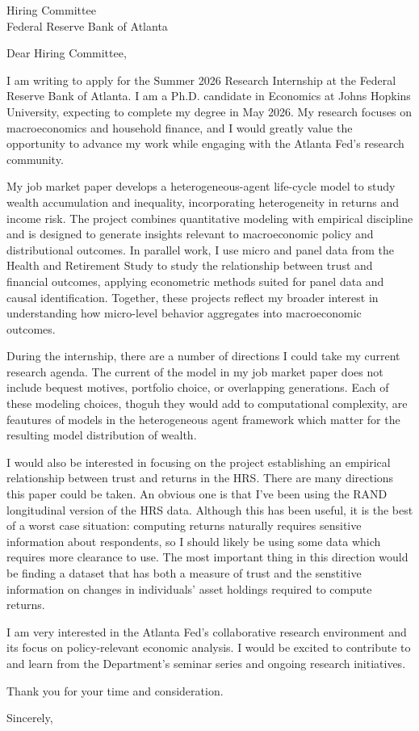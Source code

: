 \documentclass[11pt]{letter}
\begin{document}
\begin{letter}{Hiring Committee \\
Federal Reserve Bank of Atlanta}

\opening{Dear Hiring Committee,}

I am writing to apply for the Summer 2026 Research Internship at the Federal Reserve Bank of Atlanta. I am a Ph.D. candidate in Economics at Johns Hopkins University, expecting to complete my degree in May 2026. My research focuses on macroeconomics and household finance, and I would greatly value the opportunity to advance my work while engaging with the Atlanta Fed’s research community.

My job market paper develops a heterogeneous-agent life-cycle model to study wealth accumulation and inequality, incorporating heterogeneity in returns and income risk. The project combines quantitative modeling with empirical discipline and is designed to generate insights relevant to macroeconomic policy and distributional outcomes. In parallel work, I use micro and panel data from the Health and Retirement Study to study the relationship between trust and financial outcomes, applying econometric methods suited for panel data and causal identification. Together, these projects reflect my broader interest in understanding how micro-level behavior aggregates into macroeconomic outcomes.

During the internship, there are a number of directions I could take my current research agenda. The current of the model in my job market paper does not include bequest motives, portfolio choice, or overlapping generations. Each of these modeling choices, thoguh they would add to computational complexity, are feautures of models in the heterogeneous agent framework which matter for the resulting model distribution of wealth.

I would also be interested in focusing on the project establishing an empirical relationship between trust and returns in the HRS. There are many directions this paper could be taken. An obvious one is that I've been using the RAND longitudinal version of the HRS data. Although this has been useful, it is the best of a worst case situation: computing returns naturally requires sensitive information about respondents, so I should likely be using some data which requires more clearance to use. The most important thing in this direction would be finding a dataset that has both a measure of trust and the senstitive information on changes in individuals' asset holdings required to compute returns.

I am very interested in the Atlanta Fed’s collaborative research environment and its focus on policy-relevant economic analysis. I would be excited to contribute to and learn from the Department’s seminar series and ongoing research initiatives.

Thank you for your time and consideration.

\closing{Sincerely,}

\end{letter}
\end{document}
